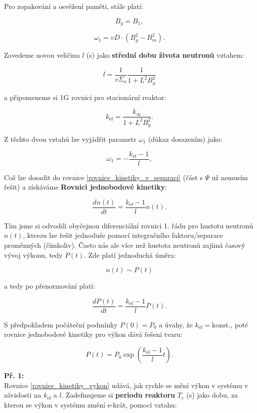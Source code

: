 Pro zopakování a osvěžení paměti, stále platí:

$$ B_g = B_1, $$

$$ \omega_1 = vD \cdot (B_g^2 - B_m^2). $$

Zavedeme novou veličinu $l$ (s) jako \textbf{střední dobu života neutronů} vztahem:

\begin{equation}
  l = \dfrac{1}{v \Sigma_a} \dfrac{1}{1+L^2B_g^2}
  \label{stredni_doba_zivota}
\end{equation}

a připomeneme si 1G rovnici pro stacionární reaktor:

$$ k_{\text{ef}} = \dfrac{k_{\infty}}{1 + L^2 B_g^2}. $$

Z těchto dvou vztahů lze vyjádřit parametr $\omega_1$ (důkaz dosazením) jako:

$$ \omega_1 = -\dfrac{k_{\text{ef}} - 1}{l}, $$

Což lze dosadit do rovnice \eqref{rovnice_kinetiky_v_separaci} (část s $\Psi$ už nemusím řešit) a získáváme \textbf{Rovnici jednobodové kinetiky}:

\begin{equation}
  \dfrac{dn(t)}{dt} = \dfrac{k_{\text{ef}} - 1}{l} n(t).
  \label{rovnice_kinetiky_reseni}
\end{equation}

Tím jsme si odvodili obyčejnou diferenciální rovnici 1. řádu pro hustotu neutronů $n(t)$, kterou lze řešit jednoduše pomocí integračního faktoru/separace proměnných (čímkoliv). Často nás ale více než hustota neutronů zajímá časový vývoj výkonu, tedy $P(t)$. Zde platí jednoduchá úměra:

$$ n(t) \sim P(t) $$

a tedy po přenormování platí:

$$ \dfrac{dP(t)}{dt} = \dfrac{k_{\text{ef}} - 1}{l} P(t). $$

S předpokladem počáteční podmínky $P(0) = P_0$ a úvahy, že $k_{\text{ef}} = \text{konst.}$, poté rovnice jednobodové kinetiky pro výkon dává řešení tvaru:

\begin{equation}
  P(t) = P_0 \exp \left ( \dfrac{k_{\text{ef}} - 1}{l} t \right ).
  \label{rovnice_kinetiky_vykon}
\end{equation}

\textbf{Př. 1:}\\

Rovnice \eqref{rovnice_kinetiky_vykon} udává, jak rychle se mění výkon v systému v závislosti na $k_{\text{ef}}$ a $l$. Zadefinujeme si \textbf{periodu reaktoru} $T_e$ (s) jako dobu, za kterou se výkon v systému změní e-krát, pomocí vztahu:

